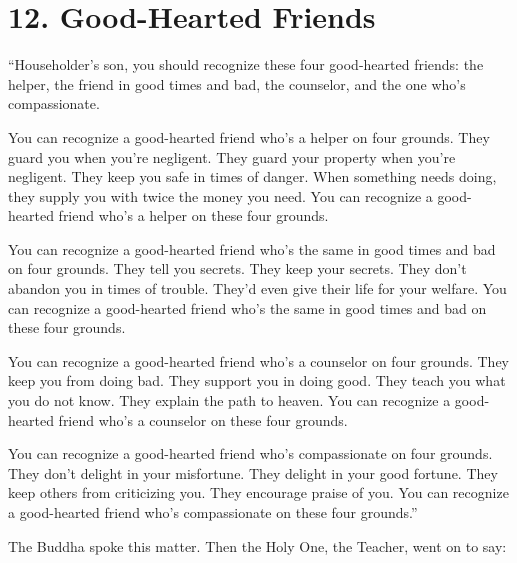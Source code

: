 \documentclass[12pt,openany]{book}%
\begin{document}
\section*{12. Good-Hearted Friends }

“Householder’s son, you should recognize these four good-hearted friends: the helper, the friend in good times and bad, the counselor, and the one who’s compassionate. 

You can recognize a good-hearted friend who’s a helper on four grounds. They guard you when you’re negligent. They guard your property when you’re negligent. They keep you safe in times of danger. When something needs doing, they supply you with twice the money you need. You can recognize a good-hearted friend who’s a helper on these four grounds. 

You can recognize a good-hearted friend who’s the same in good times and bad on four grounds. They tell you secrets. They keep your secrets. They don’t abandon you in times of trouble. They’d even give their life for your welfare. You can recognize a good-hearted friend who’s the same in good times and bad on these four grounds. 

You can recognize a good-hearted friend who’s a counselor on four grounds. They keep you from doing bad. They support you in doing good. They teach you what you do not know. They explain the path to heaven. You can recognize a good-hearted friend who’s a counselor on these four grounds. 

You can recognize a good-hearted friend who’s compassionate on four grounds. They don’t delight in your misfortune. They delight in your good fortune. They keep others from criticizing you. They encourage praise of you. You can recognize a good-hearted friend who’s compassionate on these four grounds.” 

The Buddha spoke this matter. Then the Holy One, the Teacher, went on to say: 
\end{document}
